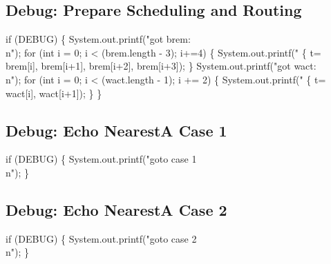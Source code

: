 \subsection{Debug: Prepare Scheduling and Routing}
\nwenddocs{}\endmoddef\nwstartdeflinemarkup{}\nwenddeflinemarkup
if (DEBUG) \{
  System.out.printf("got brem: \\n");
  for (int i = 0; i < (brem.length - 3); i+=4) \{
    System.out.printf("  \{ t=%
        brem[i], brem[i+1], brem[i+2], brem[i+3]);
  \}
  System.out.printf("got wact: \\n");
  for (int i = 0; i < (wact.length - 1); i += 2) \{
    System.out.printf("  \{ t=%
      wact[i], wact[i+1]);
  \}
\}
\nwendcode{}\nwdocspar

\subsection{Debug: Echo NearestA Case 1}

\nwenddocs{}\endmoddef\nwstartdeflinemarkup{}\nwenddeflinemarkup
if (DEBUG) \{
  System.out.printf("goto case 1\\n");
\}
\nwendcode{}\nwdocspar

\subsection{Debug: Echo NearestA Case 2}

\nwenddocs{}\endmoddef\nwstartdeflinemarkup{}\nwenddeflinemarkup
if (DEBUG) \{
  System.out.printf("goto case 2\\n");
\}
\nwendcode{}\nwdocspar

